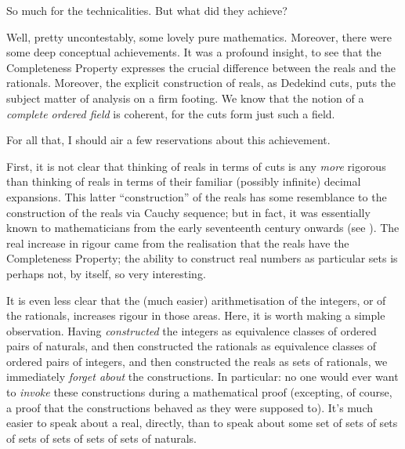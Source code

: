 \documentclass[../../../include/open-logic-section]{subfiles}
\begin{document}
	
So much for the technicalities. But what did they achieve?

Well, pretty uncontestably, some {lovely} pure mathematics. Moreover, there were some deep conceptual achievements. It was a profound insight, to see that the Completeness Property expresses the crucial difference between the reals and the rationals. Moreover, the explicit construction of reals, as Dedekind cuts, puts the subject matter of analysis on a firm footing. We know that the notion of a \emph{complete ordered field} is coherent, for the cuts form just such a field. 

For all that, I should air a few reservations about this achievement. 

First, it is not clear that thinking of reals in terms of cuts is any \emph{more} rigorous than thinking of reals in terms of their familiar (possibly infinite) decimal expansions. This latter ``construction'' of the reals has some resemblance to the construction of the reals via Cauchy sequence; but in fact, it was essentially known to mathematicians from the early seventeenth century onwards (see 	). The real increase in rigour came from the realisation that the reals have the Completeness Property; the ability to construct real numbers as particular sets is perhaps not, by itself, so very interesting.

It is even less clear that the (much easier) arithmetisation of the integers, or of the rationals, increases rigour in those areas. Here, it is worth making a simple observation. Having \emph{constructed} the integers as equivalence classes of ordered pairs of naturals, and then constructed the rationals as equivalence classes of ordered pairs of integers, and then constructed the reals as sets of rationals, we immediately \emph{forget about} the constructions. In particular: no one would ever want to \emph{invoke} these constructions during a mathematical proof (excepting, of course, a proof that the constructions behaved as they were supposed to). It's much easier to speak about a real, directly, than to speak about some set of sets of sets of sets of sets of sets of sets of naturals. 
%
%
%
	
\end{document}
